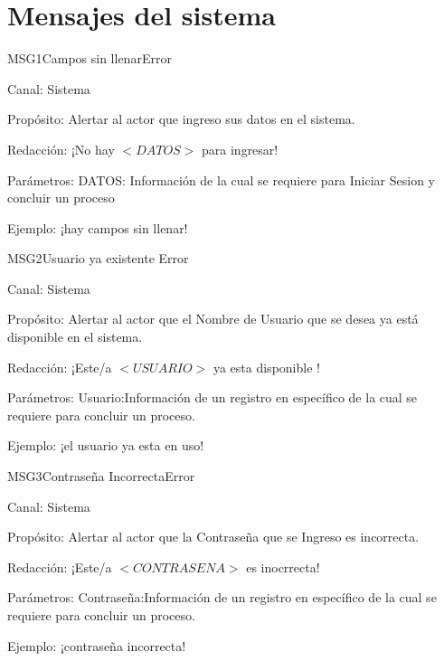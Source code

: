 \chapter{Mensajes del sistema}


\begin{mensaje}{MSG1}{Campos sin llenar}{Error \msgError}
	\item[Canal:] Sistema
    \item[Propósito:] Alertar al actor que ingreso sus datos en el sistema.
    \item[Redacción:] ¡No hay $<DATOS>$ para ingresar!
    \item[Parámetros:] DATOS: Información de la cual se requiere para Iniciar Sesion y concluir un proceso
    \item[Ejemplo:] ¡hay campos sin llenar!
\end{mensaje}
\begin{mensaje}{MSG2}{Usuario ya existente }{Error \msgError}
	\item[Canal:] Sistema
    \item[Propósito:] Alertar al actor que el Nombre de Usuario que se desea ya está disponible en el sistema.
    \item[Redacción:] ¡Este/a $<USUARIO>$ ya esta disponible !
    \item[Parámetros:] Usuario:Información de un registro en específico de la cual se requiere para concluir un proceso.
    \item[Ejemplo:] ¡el usuario ya esta en uso!
\end{mensaje}
\begin{mensaje}{MSG3}{Contraseña Incorrecta}{Error \msgError}
	\item[Canal:] Sistema
    \item[Propósito:] Alertar al actor que la Contraseña  que se Ingreso es incorrecta.
    \item[Redacción:] ¡Este/a $<CONTRASENA>$ es inocrrecta!
    \item[Parámetros:] Contraseña:Información de un registro en específico de la cual se requiere para concluir un proceso.
    \item[Ejemplo:] ¡contraseña incorrecta!
\end{mensaje}
